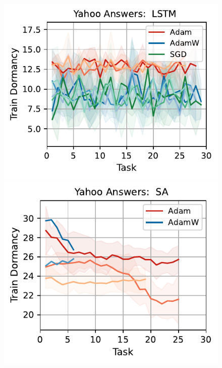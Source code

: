 \begin{figure}[htb!]
{        \includegraphics[width=\textwidth]{figs/Dormancy/nlp/lstm/yahoo_answers_50.pdf}
        \includegraphics[width=\textwidth]{figs/Dormancy/nlp/attention/yahoo_answers_40.pdf}
}
\end{figure}
